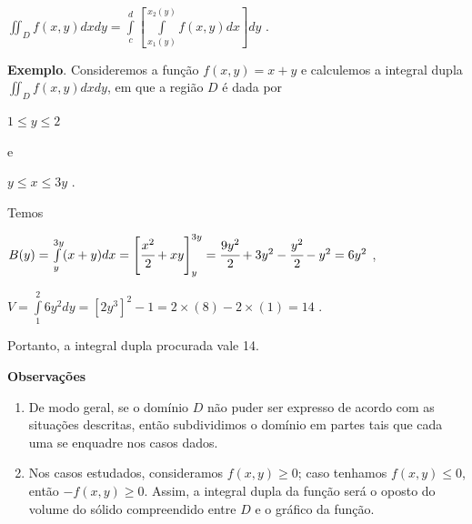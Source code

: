 			$\iint_{D} f(x, y)dxdy = \int \limits^{d}_{c} \left[ \int \limits^{x_{2}(y)}_{x_{1}(y)} f(x, y)dx \right] dy$ .

			\bigskip

			\textbf{Exemplo}. Consideremos a função $f(x, y) = x + y$ e calculemos a integral dupla $\iint_{D} f(x, y)dxdy$, em que a região $D$ é dada por

			\medskip

			$1 \leq y \leq 2$

			\smallskip

			e

			\smallskip

			$y \leq x \leq 3y$ .

			\medskip

			Temos

			\medskip

			$B(y) = \int \limits^{3y}_{y} (x + y)dx = \left[ \cfrac{x^{2}}{2} + xy \right]^{3y}_{y} = \cfrac{9y^{2}}{2} + 3y^{2} - \cfrac{y^{2}}{2} - y^{2} = 6y^{2}$ ,

			$V = \int \limits^{2}_{1} 6y^{2}dy = [2y^{3}]^{2}-{1} = 2 \times (8) - 2 \times (1) = 14$ .

			\medskip

			Portanto, a integral dupla procurada vale 14.

			\bigskip

			\textbf{Observações}

			\begin{enumerate}[label=\alph*)]

				\item De modo geral, se o domínio $D$ não puder ser expresso de acordo com as situações descritas, então subdividimos o domínio em partes tais que cada uma se enquadre nos casos dados.

				\item Nos casos estudados, consideramos $f(x, y) \geq 0$; caso tenhamos $f(x, y) \leq 0$, então $-f(x, y) \geq 0$. Assim, a integral dupla da função será o oposto do volume do sólido compreendido entre $D$ e o gráfico da função.
				
			\end{enumerate}